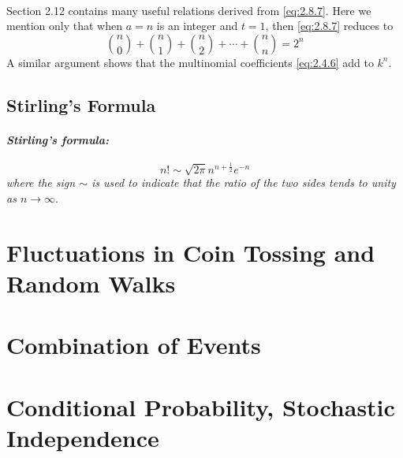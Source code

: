 \documentclass{article}
\numberwithin{equation}{subsection}
\begin{document}
			\paragraph{} Section 2.12 contains many useful relations derived from \eqref{eq:2.8.7}. Here we mention only that when $a=n$ is an integer and $t=1$, then \eqref{eq:2.8.7} reduces to 
			\begin{equation}
			\label{eq:2.8.12}
			{n\choose 0} + {n\choose 1} + {n \choose 2} + \cdots + {n\choose n} = 2^n
			\end{equation}
			A similar argument shows that the multinomial coefficients \eqref{eq:2.4.6} add to $k^n$.
		\subsection{Stirling's Formula}
			\paragraph{\textit{Stirling's formula:}}  
			\begin{equation}
				\label{eq:2.9.1}
				n!\sim\sqrt{2\pi}n^{n+\frac{1}{2}}e^{-n}
			\end{equation}
			\textit{where the sign $\sim$ is used to indicate that the ratio of the two sides tends to unity as $n\rightarrow \infty$}.
	\newpage
	\section{Fluctuations in Coin Tossing and Random Walks}
			
	\newpage
	\section{Combination of Events}
					
	\newpage
	\section{Conditional Probability, Stochastic Independence}
			
		
\end{document}
